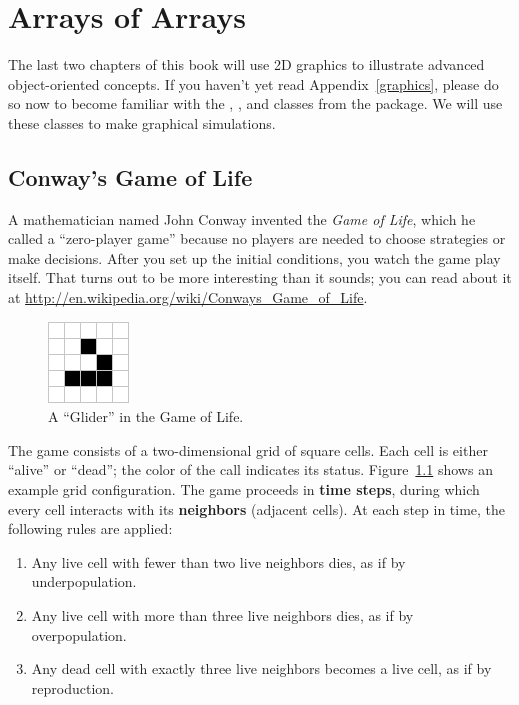 \chapter{Arrays of Arrays}

The last two chapters of this book will use 2D graphics to illustrate advanced object-oriented concepts.
If you haven't yet read Appendix~\ref{graphics}, please do so now to become familiar with the , , and  classes from the  package.
We will use these classes to make graphical simulations.


\section{Conway's Game of Life}

A mathematician named John Conway invented the {\it Game of Life}, which he called a ``zero-player game'' because no players are needed to choose strategies or make decisions.
After you set up the initial conditions, you watch the game play itself.
That turns out to be more interesting than it sounds; you can read about it at \url{http://en.wikipedia.org/wiki/Conways_Game_of_Life}.

\begin{figure}[!ht]
\begin{center}
\includegraphics{figs/glider.png}
\caption{A ``Glider'' in the Game of Life.}
\label{fig:glider}
\end{center}
\end{figure}

The game consists of a two-dimensional grid of square cells.
Each cell is either ``alive'' or ``dead''; the color of the call indicates its status.
Figure~\ref{fig:glider} shows an example grid configuration.
The game proceeds in {\bf time steps}, during which every cell interacts with its {\bf neighbors} (adjacent cells).
At each step in time, the following rules are applied:

\begin{enumerate}
\item Any live cell with fewer than two live neighbors dies, as if by underpopulation.
\item Any live cell with more than three live neighbors dies, as if by overpopulation.
\item Any dead cell with exactly three live neighbors becomes a live cell, as if by reproduction.
\end{enumerate}

